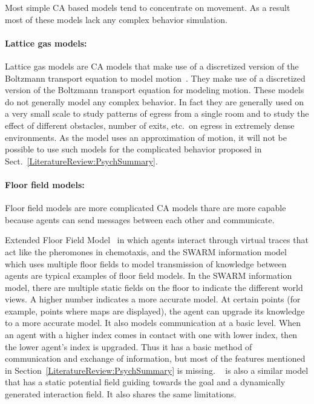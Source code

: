 Most simple CA based models tend to concentrate on movement. As a result most of these models lack any complex behavior simulation.


\paragraph{Lattice gas models:}

Lattice gas models are CA models that make use of a discretized version of the Boltzmann transport equation to model motion~\cite{Marconi:2002ue,Marconi2002,Nagai:2004kl}. They make use of a discretized version of the Boltzmann transport equation for modeling motion. These models do not generally model any complex behavior. In fact they are generally used on a very small scale to study patterns of egress from a single room and to study the effect of different obstacles, number of exits, etc.\ on egress in extremely dense environments. As the model uses an approximation of motion, it will not be possible to use such models for the complicated behavior proposed in Sect.~\ref{LiteratureReview:PsychSummary}.

\paragraph{Floor field models:}
Floor field models are more complicated CA models thare are more capable because agents can send messages between each other and communicate. 

Extended Floor Field Model~\cite{nishinari2004extended} in which agents interact through virtual traces that act like the pheromones in chemotaxis, and the SWARM information model~\cite{Henein:2006jq} which uses multiple floor fields to model transmission of knowledge between agents are typical examples of floor field models. In the SWARM information model, there are multiple static fields on the floor to indicate the different world views. A higher number indicates a more accurate model. At certain points (for example, points where maps are displayed), the agent can upgrade its knowledge to a more accurate model. It also models communication at a basic level. When an agent with a higher index comes in contact with one with lower index, then the lower agent's index is upgraded. Thus it has a basic method of communication and exchange of information, but most of the features mentioned in Section~\ref{LiteratureReview:PsychSummary} is missing. ~\cite{Qi:2011kv} is also a similar model that has a static potential field guiding towards the goal and a dynamically generated interaction field. It also shares the same limitations.


